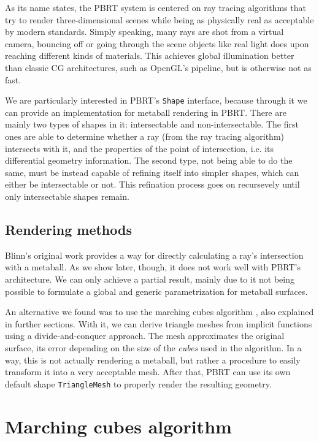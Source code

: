 \documentclass[conference]{acmsiggraph}
\begin{document}
As its name states, the PBRT system is centered on ray tracing algorithms that
try to render three-dimensional scenes while being as physically real as
acceptable by modern standards. Simply speaking, many rays are shot from a
virtual camera, bouncing off or going through the scene objects like real light
does upon reaching different kinds of materials. This achieves global
illumination better than classic CG architectures, such as OpenGL's pipeline, 
but is otherwise not as fast.

We are particularly interested in PBRT's \texttt{Shape} interface, because
through it we can provide an implementation for metaball rendering in PBRT.
There are mainly two types of shapes in it: intersectable and non-intersectable.
The first ones are able to determine whether a ray (from the ray tracing
algorithm) intersects with it, and the properties of the point of intersection,
i.e. its differential geometry information. The second type, not being able to
do the same, must be instead capable of refining itself into simpler shapes,
which can either be intersectable or not. This refination process goes on
recursevely until only intersectable shapes remain.

\subsection{Rendering methods}

Blinn's original work  provides a way
for directly calculating a ray's intersection with a metaball. As we show
later, though, it does not work well with PBRT's architecture. We can only
achieve a partial result, mainly due to it not being possible to formulate a
global and generic parametrization for metaball surfaces.

An alternative we found was to use the marching cubes algorithm
\cite{Lorensen:1987:MCH:37402.37422}, also explained in further sections. With
it, we can derive triangle meshes from implicit functions using a
divide-and-conquer approach. The mesh approximates the original surface, its
error depending on the size of the \textit{cubes} used in the algorithm. In a
way, this is not actually rendering a metaball, but rather a procedure to
easily transform it into a very acceptable mesh. After that, PBRT can use its
own default shape \texttt{TriangleMesh} to properly render the resulting
geometry.

\section{Marching cubes algorithm}
\end{document}
